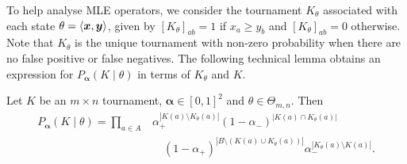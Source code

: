 To help analyse MLE operators, we consider the tournament $K_\theta$ associated
with each state $\theta = \langle{\bm{x}, \bm{y}}\rangle$, given by $[K_\theta]_{ab} =
1$ if $x_a \ge y_b$ and $[K_\theta]_{ab} = 0$ otherwise. Note that $K_\theta$
is the unique tournament with non-zero probability when there are no false
positive or false negatives. The following technical lemma obtains an
expression for $P_{\bm{\alpha}}(K \mid \theta)$ in terms of $K_\theta$ and $K$.

\begin{lemma}
   \label{tourn_result_probexpression}

   Let $K$ be an $m \times n$ tournament, $\bm{\alpha} \in [0,1]^2$ and
   $\theta \in \Theta_{m,n}$. Then
   \begin{equation*}
      \begin{split}
          P_{\bm{\alpha}}(K \mid \theta)
          =
          \prod_{a \in A}
            &\alpha_+^{|K(a) \setminus K_\theta(a)|}
            (1 - \alpha_-)^{|K(a) \cap K_\theta(a)|}
            \\
            &\quad (1 - \alpha_+)^{|B \setminus (K(a) \cup K_\theta(a))|}
            \alpha_-^{|K_\theta(a) \setminus K(a)|}.
      \end{split}
   \end{equation*}
\end{lemma}


